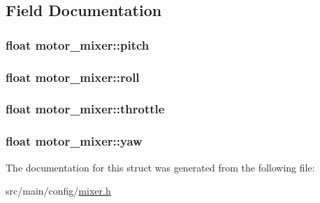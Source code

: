\subsection{Field Documentation}
\hypertarget{structmotor__mixer_abd6d66073c034ccd0f33da1dc32cb224}{
\subsubsection[{pitch}]{\setlength{\rightskip}{0pt plus 5cm}float motor\+\_\+mixer\+::pitch}}\label{structmotor__mixer_abd6d66073c034ccd0f33da1dc32cb224}
\hypertarget{structmotor__mixer_af0283249c0c19f18b09a46e8d297780d}{
\subsubsection[{roll}]{\setlength{\rightskip}{0pt plus 5cm}float motor\+\_\+mixer\+::roll}}\label{structmotor__mixer_af0283249c0c19f18b09a46e8d297780d}
\hypertarget{structmotor__mixer_a2166ebcf3651014bb63900bbb59dc8a7}{
\subsubsection[{throttle}]{\setlength{\rightskip}{0pt plus 5cm}float motor\+\_\+mixer\+::throttle}}\label{structmotor__mixer_a2166ebcf3651014bb63900bbb59dc8a7}
\hypertarget{structmotor__mixer_a2c994c946d402c2146580706d5556d3b}{
\subsubsection[{yaw}]{\setlength{\rightskip}{0pt plus 5cm}float motor\+\_\+mixer\+::yaw}}\label{structmotor__mixer_a2c994c946d402c2146580706d5556d3b}


The documentation for this struct was generated from the following file\+:\begin{DoxyCompactItemize}
\item 
src/main/config/\hyperlink{config_2mixer_8h}{mixer.\+h}\end{DoxyCompactItemize}
